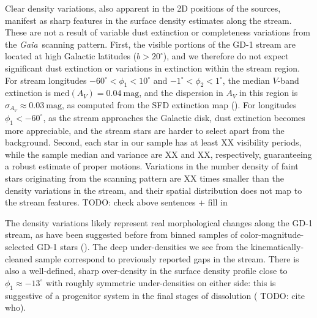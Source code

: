 \documentclass[modern]{aastex62}
\newcommand{\gaia}{\textsl{Gaia}}
\newcommand{\todo}[1]{{\color{red} TODO: #1}}
\begin{document}
Clear density variations, also apparent in the 2D positions of the sources,
manifest as sharp features in the surface density estimates along the stream.
These are not a result of variable dust extinction or completeness variations
from the \gaia\ scanning pattern.
First, the visible portions of the GD-1 stream are located at high Galactic
latitudes ($b > 20^\circ$), and we therefore do not expect significant dust
extinction or variations in extinction within the stream region.
For stream longitudes $-60^\circ < \phi_1 < 10^\circ$ and $-1^\circ < \phi_2 <
1^\circ$, the median $V$-band extinction is $\textrm{med}\left(A_V\right) =
0.04~\textrm{mag}$, and the dispersion in $A_V$ in this region is $\sigma_{A_V}
\approx 0.03~\textrm{mag}$, as computed from the SFD
extinction map (\citealt{Schlegel:1998}).
For longitudes $\phi_1 < -60^\circ$, as the stream approaches the Galactic disk,
dust extinction becomes more appreciable, and the stream stars are harder to
select apart from the background.
Second, each star in our sample has at least XX visibility periods, while the sample median and variance are XX and XX, respectively, guaranteeing a robust estimate of proper motions.
Variations in the number density of faint stars originating from the scanning pattern are XX times smaller than the density variations in the stream, and their spatial distribution does not map to the stream features.
\todo{check above sentences +  fill in}

The density variations likely represent real morphological changes along the
GD-1 stream, as have been suggested before from binned samples of
color-magnitude-selected GD-1 stars (\citealt{Carlberg:2013, DeBoer:2018}).
The deep under-densities we see from the kinematically-cleaned sample correspond
to previously reported gaps in the stream.
There is also a well-defined, sharp over-density in the surface density profile
close to $\phi_1 \approx -13^\circ$ with roughly symmetric under-densities on
either side:
this is suggestive of a progenitor system in the final stages of dissolution
(\todo{cite who}).
\end{document}
